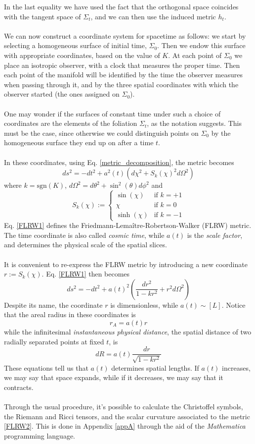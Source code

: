 \documentclass[12pt,letterpaper]{article}         %
\newcommand\para{\paragraph{}}
\begin{document}
In the last equality we have used the fact that the orthogonal space coincides with the tangent space of $\Sigma_t$, and we can then use the induced metric $h_t$.
\para
We can now construct a coordinate system for spacetime as follows: we start by selecting a homogeneous surface of initial time, $\Sigma_0$. Then we endow this surface with appropriate coordinates, based on the value of $K$. At each point of $\Sigma_0$ we place an isotropic observer, with a clock that measures the proper time. Then each point of the manifold will be identified by the time the observer measures when passing through it, and by the three spatial coordinates with which the observer started (the ones assigned on $\Sigma_0$).
\para
One may wonder if the surfaces of constant time under such a choice of coordinates are the elements of the foliation $\Sigma_t$, as the notation suggests. This must be the case, since otherwise we could distinguish points on $\Sigma_0$ by the homogeneous surface they end up on after a time $t$.
\para
In these coordinates, using Eq. \eqref{metric_decomposition}, the metric becomes 
\begin{equation}
    ds^2 =-dt^2 + a^2(t)(d\chi^2 + S_k(\chi)^2d\Omega^2)
    \label{FLRW1}
\end{equation}
where $k = \text{sgn}({K})$,  $d\Omega^2 = d\theta^2 + \sin^2(\theta)d\phi^2$ and
\[
S_k(\chi) :=
    \begin{cases} 
    \sin(\chi) & \text{if } k = +1 \\
    \chi       & \text{if } k = 0 \\
    \sinh(\chi)& \text{if } k = -1
\end{cases}
\]
Eq. \eqref{FLRW1} defines the Friedmann-Lemaître-Robertson-Walker (FLRW) metric.
The time coordinate is also called \emph{cosmic time}, while $a(t)$ is the \emph{scale factor}, and determines the physical scale of the spatial slices.
\para
It is convenient to re-express the FLRW metric by introducing a new coordinate $r := S_k(\chi)$. Eq. \eqref{FLRW1} then becomes
\begin{equation}
    ds^2 = -dt^2 + a(t)^2(\frac{dr^2}{1-kr^2} + r^2d\Omega^2)
\label{FLRW2}
\end{equation}
Despite its name, the coordinate $r$ is dimensionless, while $a(t) \sim [L]$. Notice that the areal radius in these coordinates is \[
    r_A = a(t) r
\]
while the infinitesimal \emph{instantaneous physical distance}, the spatial distance of two radially separated points at fixed $t$, is \[
    dR = a(t) \frac{dr}{\sqrt{1-kr^2}}
\]
These equations tell us that $a(t)$ determines spatial lengths. If $a(t)$ increases, we may say that space expands, while if it decreases, we may say that it contracts.
\para
Through the usual procedure, it's possible to calculate the Christoffel symbols, the Riemann and Ricci tensors, and the scalar curvature associated to the metric \eqref{FLRW2}. This is done in Appendix \ref{appA}
through the aid of the \emph{Mathematica} programming language.
\end{document}
